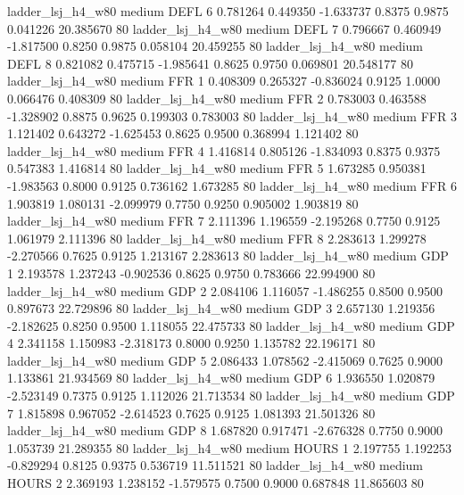      ladder_lsj_h4_w80     medium     DEFL                 6  0.781264 0.449350 -1.633737 0.8375 0.9875  0.041226   20.385670 80
     ladder_lsj_h4_w80     medium     DEFL                 7  0.796667 0.460949 -1.817500 0.8250 0.9875  0.058104   20.459255 80
     ladder_lsj_h4_w80     medium     DEFL                 8  0.821082 0.475715 -1.985641 0.8625 0.9750  0.069801   20.548177 80
     ladder_lsj_h4_w80     medium      FFR                 1  0.408309 0.265327 -0.836024 0.9125 1.0000  0.066476    0.408309 80
     ladder_lsj_h4_w80     medium      FFR                 2  0.783003 0.463588 -1.328902 0.8875 0.9625  0.199303    0.783003 80
     ladder_lsj_h4_w80     medium      FFR                 3  1.121402 0.643272 -1.625453 0.8625 0.9500  0.368994    1.121402 80
     ladder_lsj_h4_w80     medium      FFR                 4  1.416814 0.805126 -1.834093 0.8375 0.9375  0.547383    1.416814 80
     ladder_lsj_h4_w80     medium      FFR                 5  1.673285 0.950381 -1.983563 0.8000 0.9125  0.736162    1.673285 80
     ladder_lsj_h4_w80     medium      FFR                 6  1.903819 1.080131 -2.099979 0.7750 0.9250  0.905002    1.903819 80
     ladder_lsj_h4_w80     medium      FFR                 7  2.111396 1.196559 -2.195268 0.7750 0.9125  1.061979    2.111396 80
     ladder_lsj_h4_w80     medium      FFR                 8  2.283613 1.299278 -2.270566 0.7625 0.9125  1.213167    2.283613 80
     ladder_lsj_h4_w80     medium      GDP                 1  2.193578 1.237243 -0.902536 0.8625 0.9750  0.783666   22.994900 80
     ladder_lsj_h4_w80     medium      GDP                 2  2.084106 1.116057 -1.486255 0.8500 0.9500  0.897673   22.729896 80
     ladder_lsj_h4_w80     medium      GDP                 3  2.657130 1.219356 -2.182625 0.8250 0.9500  1.118055   22.475733 80
     ladder_lsj_h4_w80     medium      GDP                 4  2.341158 1.150983 -2.318173 0.8000 0.9250  1.135782   22.196171 80
     ladder_lsj_h4_w80     medium      GDP                 5  2.086433 1.078562 -2.415069 0.7625 0.9000  1.133861   21.934569 80
     ladder_lsj_h4_w80     medium      GDP                 6  1.936550 1.020879 -2.523149 0.7375 0.9125  1.112026   21.713534 80
     ladder_lsj_h4_w80     medium      GDP                 7  1.815898 0.967052 -2.614523 0.7625 0.9125  1.081393   21.501326 80
     ladder_lsj_h4_w80     medium      GDP                 8  1.687820 0.917471 -2.676328 0.7750 0.9000  1.053739   21.289355 80
     ladder_lsj_h4_w80     medium    HOURS                 1  2.197755 1.192253 -0.829294 0.8125 0.9375  0.536719   11.511521 80
     ladder_lsj_h4_w80     medium    HOURS                 2  2.369193 1.238152 -1.579575 0.7500 0.9000  0.687848   11.865603 80

